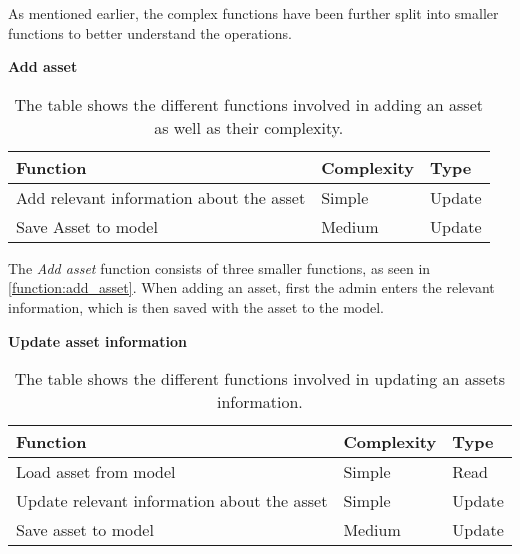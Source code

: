 As mentioned earlier, the complex functions have been further split into smaller functions to better understand the operations.

\begin{center}
    \textbf{Add asset}    
\end{center}

\begin{table}[H]
    \centering
        \begin{tabular}{|l|l|l|}
            \hline
            \textbf{Function} & \textbf{Complexity} & \textbf{Type}\\
            \hline
            \hline
            Add relevant information about the asset & Simple & Update \\
            \hline
            Save Asset to model & Medium & Update \\
            \hline
        \end{tabular}
    \caption{The table shows the different functions involved in adding an asset as well as their complexity.}
    \label{function:add_asset}
\end{table}


The \textit{Add asset} function consists of three smaller functions, as seen in \autoref{function:add_asset}. When adding an asset, first the admin enters the relevant information, which is then saved with the asset to the model.

\begin{center}
    \textbf{Update asset information}
\end{center}

\begin{table}[H]
    \centering
        \begin{tabular}{|l|l|l|}
            \hline
            \textbf{Function} & \textbf{Complexity} & \textbf{Type}\\
            \hline
            \hline
            Load asset from model & Simple & Read \\
            \hline
            Update relevant information about the asset & Simple & Update \\
            \hline
            Save asset to model & Medium & Update \\
            \hline
        \end{tabular}
    \caption{The table shows the different functions involved in updating an assets information.}
    \label{function:update_asset_information}
\end{table}

